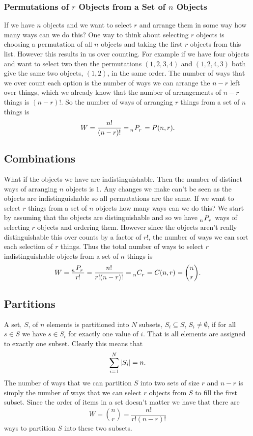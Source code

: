     \subsubsection{Permutations of \texorpdfstring{\(r\)}{r} Objects from a Set of \texorpdfstring{\(n\)}{n} Objects}
    If we have \(n\) objects and we want to select \(r\) and arrange them in some way how many ways can we do this?
    One way to think about selecting \(r\) objects is choosing a permutation of all \(n\) objects and taking the first \(r\) objects from this list.
    However this results in us over counting.
    For example if we have four objects and want to select two then the permutations \((1, 2, 3, 4)\) and \((1, 2, 4, 3)\) both give the same two objects, \((1, 2)\), in the same order.
    The number of ways that we over count each option is the number of ways we can arrange the \(n - r\) left over things, which we already know that the number of arrangements of \(n - r\) things is \((n - r)!\).
    So the number of ways of arranging \(r\) things from a set of \(n\) things is
    \[W = \frac{n!}{(n - r)!} = \perms{n}{r} = P(n, r).\]
    
    \subsection{Combinations}
    What if the objects we have are indistinguishable.
    Then the number of distinct ways of arranging \(n\) objects is \(1\).
    Any changes we make can't be seen as the objects are indistinguishable so all permutations are the same.
    If we want to select \(r\) things from a set of \(n\) objects how many ways can we do this?
    We start by assuming that the objects are distinguishable and so we have \(\perms{n}{r}\) ways of selecting \(r\) objects and ordering them.
    However since the objects aren't really distinguishable this over counts by a factor of \(r!\), the number of ways we can sort each selection of \(r\) things.
    Thus the total number of ways to select \(r\) indistinguishable objects from a set of \(n\) things is
    \[W = \frac{\perms{n}{r}}{r!} = \frac{n!}{r!(n-r)!} = \combs{n}{r} = C(n, r) = {n\choose r}.\]
    
    \subsection{Partitions}
    A set, \(S\), of \(n\) elements is partitioned into \(N\) subsets, \(S_i\subseteq S\), \(S_i\ne\emptyset\), if for all \(s\in S\) we have \(s\in S_i\) for exactly one value of \(i\).
    That is all elements are assigned to exactly one subset.
    Clearly this means that
    \[\sum_{i=1}^{N}\abs{S_i} = n.\]
    The number of ways that we can partition \(S\) into two sets of size \(r\) and \(n - r\) is simply the number of ways that we can select \(r\) objects from \(S\) to fill the first subset.
    Since the order of items in a set doesn't matter we have that there are
    \[W = {n\choose r} = \frac{n!}{r!(n-r)!}\]
    ways to partition \(S\) into these two subsets.
    
